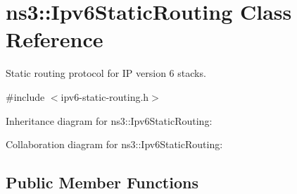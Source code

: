 \hypertarget{classns3_1_1Ipv6StaticRouting}{}\section{ns3\+:\+:Ipv6\+Static\+Routing Class Reference}
\label{classns3_1_1Ipv6StaticRouting}


Static routing protocol for IP version 6 stacks.  




{\ttfamily \#include $<$ipv6-\/static-\/routing.\+h$>$}



Inheritance diagram for ns3\+:\+:Ipv6\+Static\+Routing\+:


Collaboration diagram for ns3\+:\+:Ipv6\+Static\+Routing\+:
\subsection*{Public Member Functions}
